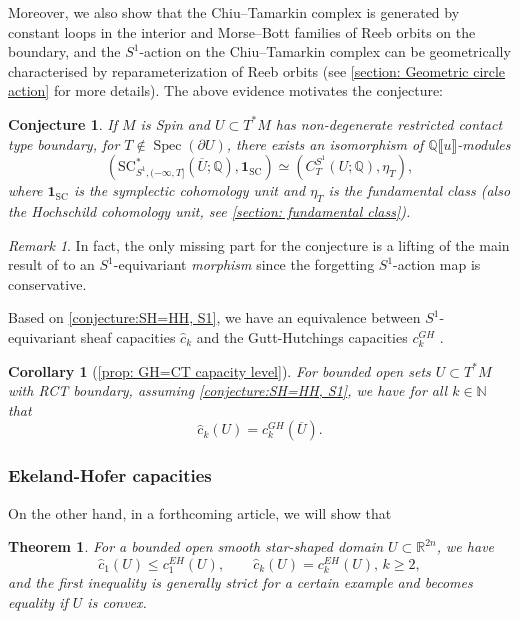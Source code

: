 \documentclass[11pt]{amsart}
\numberwithin{equation}{section}
\theoremstyle{plain}
\newtheorem{Thm}{Theorem}[section]
\newtheorem{Coro}[coro]{Corollary}
\newtheorem{Conjecture}[conjecture]{Conjecture}
\theoremstyle{definition}
\theoremstyle{remark}
\newtheorem{RMK}[rmk]{Remark}
\newcommand{\bQ} { {\mathbb{Q}}}
\newcommand{\bR} { {\mathbb{R}}}
\newcommand{\bN} { {\mathbb{N}}}
\newcommand{\fpw}[1]{{\llbracket #1\rrbracket}}
\newcommand\Spec{\operatorname{Spec}}
\begin{document}
Moreover, we also show that the Chiu--Tamarkin complex is generated by constant loops in the interior and Morse--Bott families of Reeb orbits on the boundary, and the $S^1$-action on the Chiu--Tamarkin complex can be geometrically characterised by reparameterization of Reeb orbits (see \autoref{section: Geometric circle action} for more details). The above evidence motivates the conjecture:

\begin{Conjecture}\label{conjecture:SH=HH, S1}If $M$ is Spin and $U \subset T^*M$ has non-degenerate restricted contact type boundary, for $T\notin \Spec(\partial U)$, there exists an isomorphism of $\bQ\fpw{u}$-modules
\[(\mathrm{SC}^{*}_{S^1,(-\infty,T]}(\overline{U}; \bQ),\mathbf{1}_{\mathrm{SC}}) \simeq ( C_{T}^{S^1}(U; \bQ),\eta_T),\]
where $\mathbf{1}_{\mathrm{SC}}$ is the symplectic cohomology unit and $\eta_T$ is the fundamental class (also the Hochschild cohomology unit, see \autoref{section: fundamental class}).
\end{Conjecture}
\begin{RMK}In fact, the only missing part for the conjecture is a lifting of the main result of \cite{Hochschild-Kuo-Shende-Zhang} to an $S^1$-equivariant \textit{morphism} since the forgetting $S^1$-action map is conservative.
\end{RMK}

Based on \autoref{conjecture:SH=HH, S1}, we have an equivalence between $S^1$-equivariant sheaf capacities $\widehat c_k$ and the Gutt-Hutchings capacities $c_k^{GH}$ \cite{gutthutchings2018capacities}.
\begin{Coro}[{\autoref{prop: GH=CT capacity level}}]\label{cor: GH=CT capacity}For bounded open sets $U\subset T^*M$ with RCT boundary, assuming \autoref{conjecture:SH=HH, S1}, we have for all $k\in \bN$ that 
\[\widehat{c}_k(U)=c_k^{{GH}}(\overline{U}).\] 
\end{Coro}

\subsubsection{Ekeland-Hofer capacities}
On the other hand, in a forthcoming article, we will show that
\begin{Thm}For a bounded open smooth star-shaped domain $U\subset \bR^{2n}$, we have
\[\widehat{c}_1(U)\leq c^{EH}_1(U),\qquad \widehat{c}_k(U)= c^{EH}_k(U),\,k \geq 2,\]
and the first inequality is generally strict for a certain example and becomes equality if $U$ is convex. 
\end{Thm}
\end{document}
